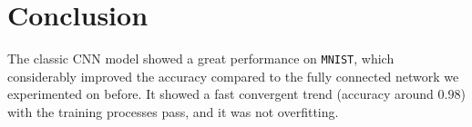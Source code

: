 \documentclass[10pt]{article}
\begin{document}
\section{Conclusion}
The classic CNN model showed a great performance on \texttt{MNIST}, which considerably improved the accuracy compared to the fully connected network we experimented on before. It showed a fast convergent trend (accuracy around $0.98$) with the training processes pass, and it was not overfitting.
\clearpage


\end{document}
